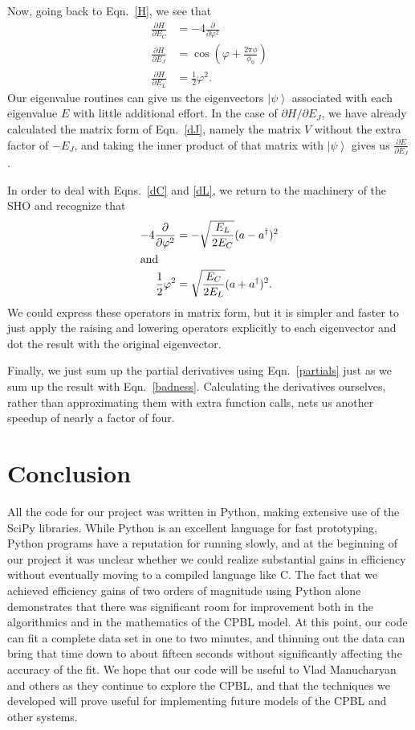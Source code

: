 \documentclass[twocolumn]{revtex4}
\newcommand{\ket}[1]{\left| #1 \right>}
\begin{document}
Now, going back to Eqn.~\ref{H}, we see that
\begin{align}
  \label{dC}
  \frac{\partial H}{\partial E_C} &= -4\frac{\partial}{\partial
    \varphi^2}\\
  \label{dJ}
  \frac{\partial H}{\partial E_J} &= \cos(\varphi +
  \frac{2\pi\phi}{\phi_0})\\
  \label{dL}
  \frac{\partial H}{\partial E_L} &= \frac{1}{2}\varphi^2.
\end{align}
Our eigenvalue routines can give us the eigenvectors $\ket{\psi}$
associated with each eigenvalue $E$ with little additional effort. In
the case of $\partial H/\partial E_J$, we have already calculated the
matrix form of Eqn.~\ref{dJ}, namely the matrix $V$ without the extra
factor of $-E_J$, and taking the inner product of that matrix with
$\ket{\psi}$ gives us $\frac{\partial E}{\partial E_J}$.

In order to deal with Eqns.~\ref{dC} and \ref{dL}, we return to the
machinery of the SHO and recognize that
\begin{align}
  -4\frac{\partial}{\partial \varphi^2} &= -\sqrt{\frac{E_L}{2E_C}}
  (a-a^\dagger)^2\\
  \intertext{and}
  \frac{1}{2}\varphi^2 &= \sqrt{\frac{E_C}{2E_L}} (a+a^\dagger)^2.
\end{align}
We could express these operators in matrix form, but it is simpler and
faster to just apply the raising and lowering operators explicitly to
each eigenvector and dot the result with the original eigenvector.

Finally, we just sum up the partial derivatives using
Eqn.~\ref{partials} just as we sum up the result with
Eqn.~\ref{badness}. Calculating the derivatives ourselves, rather than
approximating them with extra function calls, nets us another speedup
of nearly a factor of four.

\section{Conclusion}
All the code for our project was written in Python, making extensive
use of the SciPy libraries. While Python is an excellent language for
fast prototyping, Python programs have a reputation for running
slowly, and at the beginning of our project it was unclear whether we
could realize substantial gains in efficiency without eventually
moving to a compiled language like C. The fact that we achieved
efficiency gains of two orders of magnitude using Python alone
demonstrates that there was significant room for improvement both in
the algorithmics and in the mathematics of the CPBL model. At this
point, our code can fit a complete data set in one to two minutes, and
thinning out the data can bring that time down to about fifteen
seconds without significantly affecting the accuracy of the fit. We
hope that our code will be useful to Vlad Manucharyan and others as
they continue to explore the CPBL, and that the techniques we
developed will prove useful for implementing future models of the CPBL
and other systems.
\end{document}

